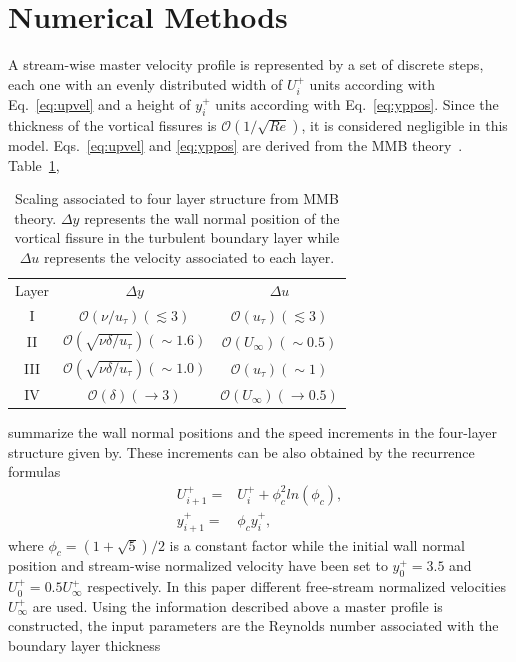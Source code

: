 \documentclass[aps,reprint,amsmath,amssymb,prl]{revtex4-1}%
\begin{document}
\maketitle
\section{Numerical Methods}
A stream-wise master velocity profile is represented by a set of discrete steps, each one with an evenly distributed width of $U_i^+$ units according with Eq.~\ref{eq:upvel} and a height of $y^+_i$ units according with Eq.~\ref{eq:yppos}. Since the thickness of the
vortical fissures is  $\mathcal{O}(1/\sqrt{Re})$, it is considered negligible in this model. Eqs.~\ref{eq:upvel} and \ref{eq:yppos} are derived from the MMB theory~\citep{Klewickimmb}. Table~\ref{tab:4layerstructure},%
\begin{table}[b]%
\caption{\label{tab:4layerstructure}%
Scaling associated to four layer structure from MMB theory. $\Delta y$ represents the wall normal position of the vortical fissure in the turbulent boundary layer while $\Delta u$ represents the velocity associated to each layer.
}
\begin{ruledtabular}
\begin{tabular}{ccc}
\textrm{Layer}&
\textrm{$\Delta y$}&
\textrm{$\Delta u$}\\
\colrule
I &$\mathcal{O}(\nu/u_{\tau})(\lesssim 3)$&$\mathcal{O}(u_{\tau})(\lesssim 3)$\\
II &$\mathcal{O}(\sqrt{\nu\delta/u_{\tau}})(\sim 1.6)$&$\mathcal{O}(U_{\infty})(\sim 0.5)$\\
III &$\mathcal{O}(\sqrt{\nu\delta/u_{\tau}})(\sim 1.0)$&$\mathcal{O}(u_{\tau})(\sim 1)$\\
IV &$\mathcal{O}(\delta)(\rightarrow 3)$&$\mathcal{O}(U_{\infty})(\rightarrow 0.5)$ \\
\end{tabular}
\end{ruledtabular}
\end{table}
summarize the wall normal positions and the speed increments in the four-layer structure given by\cite{Klewickimmb}. These increments can be also obtained by the recurrence formulas
\begin{align}
U^+_{i+1}=&U^+_i+\phi_c^2 ln(\phi_c) \label{eq:upvel},\\
y^+_{i+1}=&\phi_c y^+_i \label{eq:yppos},
\end{align}
where  $\phi_c=(1+\sqrt{5})/2$ is a constant factor while the initial wall normal position and stream-wise normalized velocity have been set to $y^+_0=3.5$ and $U^+_0=0.5 U_{\infty}^+$ respectively. In this paper different free-stream normalized velocities $U_{\infty}^+$ are used. Using the information described above a master profile is constructed, the input parameters are the Reynolds number associated with the boundary layer thickness
\end{document}
